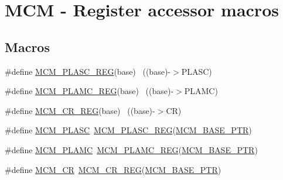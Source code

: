 \hypertarget{group___m_c_m___register___accessor___macros}{}\section{M\+CM -\/ Register accessor macros}
\label{group___m_c_m___register___accessor___macros}
\subsection*{Macros}
\begin{DoxyCompactItemize}
\item 
\#define \hyperlink{group___m_c_m___register___accessor___macros_gad331cc7eeaf62bb3d0fc388993df2a8f}{M\+C\+M\+\_\+\+P\+L\+A\+S\+C\+\_\+\+R\+EG}(base)                                        ~((base)-\/$>$P\+L\+A\+SC)
\item 
\#define \hyperlink{group___m_c_m___register___accessor___macros_ga56804c4b9f516c18d994d033cae1dc30}{M\+C\+M\+\_\+\+P\+L\+A\+M\+C\+\_\+\+R\+EG}(base)                                        ~((base)-\/$>$P\+L\+A\+MC)
\item 
\#define \hyperlink{group___m_c_m___register___accessor___macros_ga87cff4614e51fe78514025afa607e87c}{M\+C\+M\+\_\+\+C\+R\+\_\+\+R\+EG}(base)                                              ~((base)-\/$>$CR)
\item 
\#define \hyperlink{group___m_c_m___register___accessor___macros_ga1741cb7cdef46052c2ac9e7d28fb2b53}{M\+C\+M\+\_\+\+P\+L\+A\+SC}~\hyperlink{group___m_c_m___register___accessor___macros_gad331cc7eeaf62bb3d0fc388993df2a8f}{M\+C\+M\+\_\+\+P\+L\+A\+S\+C\+\_\+\+R\+EG}(\hyperlink{group___m_c_m___peripheral_gad41e931f176c230831e3dbad45117841}{M\+C\+M\+\_\+\+B\+A\+S\+E\+\_\+\+P\+TR})
\item 
\#define \hyperlink{group___m_c_m___register___accessor___macros_ga63f36c9c5700eb5fca4fe3852e1d6dfd}{M\+C\+M\+\_\+\+P\+L\+A\+MC}~\hyperlink{group___m_c_m___register___accessor___macros_ga56804c4b9f516c18d994d033cae1dc30}{M\+C\+M\+\_\+\+P\+L\+A\+M\+C\+\_\+\+R\+EG}(\hyperlink{group___m_c_m___peripheral_gad41e931f176c230831e3dbad45117841}{M\+C\+M\+\_\+\+B\+A\+S\+E\+\_\+\+P\+TR})
\item 
\#define \hyperlink{group___m_c_m___register___accessor___macros_ga36dc3a2bb3893931d3c37cbe03661635}{M\+C\+M\+\_\+\+CR}~\hyperlink{group___m_c_m___register___accessor___macros_ga87cff4614e51fe78514025afa607e87c}{M\+C\+M\+\_\+\+C\+R\+\_\+\+R\+EG}(\hyperlink{group___m_c_m___peripheral_gad41e931f176c230831e3dbad45117841}{M\+C\+M\+\_\+\+B\+A\+S\+E\+\_\+\+P\+TR})

\end{DoxyCompactItemize}
